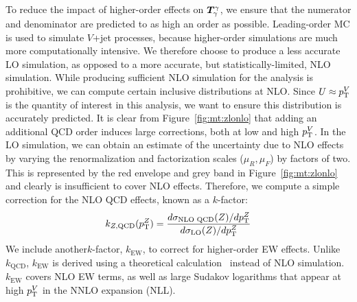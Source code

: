 To reduce the impact of higher-order effects on $\bm{T}^{\gamma}_{\gamma}$, we ensure that the numerator and denominator are predicted to as high an order as possible.
Leading-order MC is used to simulate $V$+jet processes, because higher-order simulations are much more computationally intensive.
We therefore choose to produce a less accurate LO simulation, as opposed to a more accurate, but statistically-limited, NLO simulation.
While producing sufficient NLO simulation for the analysis is prohibitive, we can compute certain inclusive distributions at NLO.
Since $U\approx p_\mathrm{T}^V$ is the quantity of interest in this analysis, we want to ensure this distribution is accurately predicted.
It is clear from Figure~\ref{fig:mt:zlonlo} that adding an additional QCD order induces large corrections, both at low and high $p_\mathrm{T}^V$.
In the LO simulation, we can obtain an estimate of the uncertainty due to NLO effects by varying the renormalization and factorization scales ($\mu_R,\mu_F$) by factors of two.
This is represented by the red envelope and grey band in Figure~\ref{fig:mt:zlonlo} and clearly is insufficient to cover NLO effects.
Therefore, we compute a simple correction for the NLO QCD effects, known as a $k$-factor:
\begin{equation}
    k_{Z,\mathrm{QCD}}(p_\mathrm{T}^Z) = \frac{d\sigma_\text{NLO QCD}(Z) / dp_\mathrm{T}^Z}{d\sigma_\mathrm{LO}(Z) / dp_\mathrm{T}^Z}
\end{equation}
We include another$k$-factor, $k_\mathrm{EW}$, to correct for higher-order EW effects.
Unlike $k_\mathrm{QCD}$, $k_\mathrm{EW}$ is derived using a theoretical calculation~\cite{ewk2,ewk3,ewk1} instead of NLO simulation.
$k_\mathrm{EW}$ covers NLO EW terms, as well as large Sudakov logarithms that appear at high $p_\mathrm{T}^V$ in the NNLO expansion (NLL).


